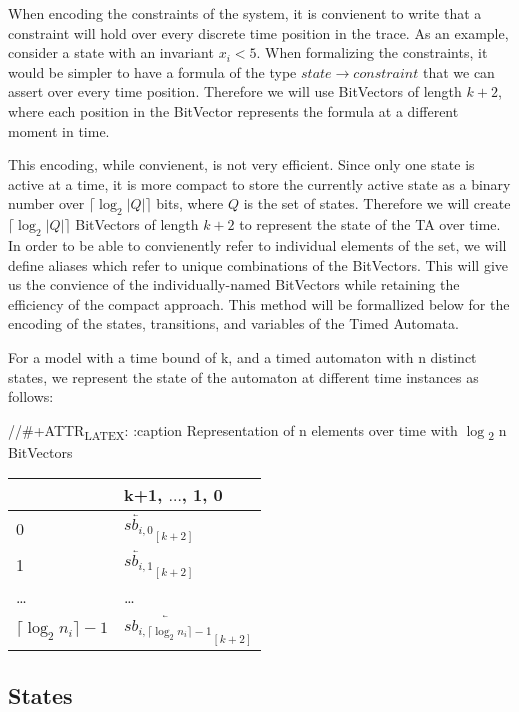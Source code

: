 \documentclass[a4paper,11pt]{article}
\begin{document}
When encoding the constraints of the system, it is convienent to write that a
constraint will hold over every discrete time position in the trace. As an
example, consider a state with an invariant \(x_i < 5\). When formalizing the
constraints, it would be simpler to have a formula of the type \(state
\rightarrow constraint\) that we can assert over every time position. Therefore
we will use BitVectors of length \(k+2\), where each position in the BitVector
represents the formula at a different moment in time.

This encoding, while convienent, is not very efficient. Since only one state is
active at a time, it is more compact to store the currently active state as a
binary number over \(\lceil\log_2 |Q|\rceil\) bits, where \(Q\) is the set of
states. Therefore we will create \(\lceil\log_2 |Q|\rceil\) BitVectors of length
\(k+2\) to represent the state of the TA over time. In order to be able to
convienently refer to individual elements of the set, we will define aliases
which refer to unique combinations of the BitVectors. This will give us the
convience of the individually-named BitVectors while retaining the efficiency of
the compact approach. This method will be formallized below for the encoding of
the states, transitions, and variables of the Timed Automata.

For a model with a time bound of k, and a timed automaton with n distinct
states, we represent the state of the automaton at different time instances as
follows:

//\#+ATTR\textsubscript{LATEX}: :caption Representation of n elements over time with \(\log\)\textsubscript{2} n BitVectors
\begin{center}
\begin{tabular}{ll}
 & k+1, \(\ldots\), 1, 0\\
\hline
0 & \(\overleftarrow{sb_{i,0}}_{[k+2]}\)\\
1 & \(\overleftarrow{sb_{i,1}}_{[k+2]}\)\\
\ldots{} & \ldots{}\\
\(\lceil \log_2 n_i \rceil -1\) & \(\overleftarrow{sb_{i, \lceil \log_2 n_i \rceil -1}}_{[k+2]}\)\\
\end{tabular}
\end{center}


\subsection{States}
\label{sec:org6a71536}
\end{document}
